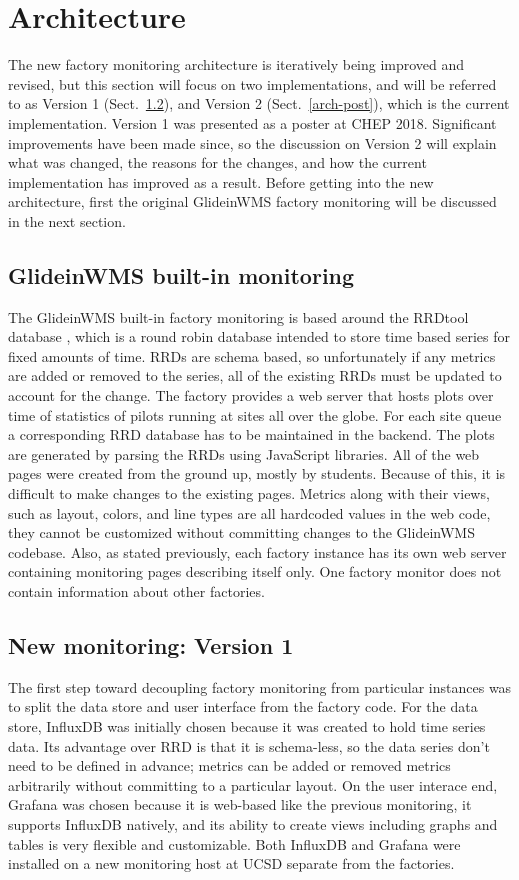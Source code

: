\documentclass{webofc}
\begin{document}
\section{Architecture}
\label{arch}
The new factory monitoring architecture is iteratively being improved and revised, but this section will focus on two implementations, and will be referred to as Version 1 (Sect.~\ref{arch-pre}), and Version 2 (Sect.~\ref{arch-post}), which is the current implementation. Version 1 was presented as a poster at CHEP 2018. Significant improvements have been made since, so the discussion on Version 2 will explain what was changed, the reasons for the changes, and how the current implementation has improved as a result. Before getting into the new architecture, first the original GlideinWMS factory monitoring will be discussed in the next section.

\subsection{GlideinWMS built-in monitoring}
\label{arch-orig}
The GlideinWMS built-in factory monitoring is based around the RRDtool database \cite{rrdtool}, which is a round robin database intended to store time based series for fixed amounts of time. RRDs are schema based, so unfortunately if any metrics are added or removed to the series, all of the existing RRDs must be updated to account for the change. The factory provides a web server that hosts plots over time of statistics of pilots running at sites all over the globe. For each site queue a corresponding RRD database has to be maintained in the backend. The plots are generated by parsing the RRDs using JavaScript libraries. All of the web pages were created from the ground up, mostly by students. Because of this, it is difficult to make changes to the existing pages. Metrics along with their views, such as layout, colors, and line types are all hardcoded values in the web code, they cannot be customized without committing changes to the GlideinWMS codebase. Also, as stated previously, each factory instance has its own web server containing monitoring pages describing itself only. One factory monitor does not contain information about other factories.

\subsection{New monitoring: Version 1}
\label{arch-pre}
The first step toward decoupling factory monitoring from particular instances was to split the data store and user interface from the factory code. For the data store, InfluxDB \cite{influxdb} was initially chosen because it was created to hold time series data. Its advantage over RRD is that it is schema-less, so the data series don't need to be defined in advance; metrics can be added or removed metrics arbitrarily without committing to a particular layout. On the user interace end, Grafana was chosen because it is web-based like the previous monitoring, it supports InfluxDB natively, and its ability to create views including graphs and tables is very flexible and customizable. Both InfluxDB and Grafana were installed on a new monitoring host at UCSD separate from the factories.
\end{document}
